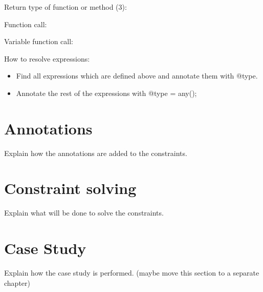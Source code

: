 \documentclass[../main.tex]{subfiles}
\begin{document}
    Return type of function or method (3):    
    \begin{prooftree}
    \end{prooftree}    
    
    \hrulefill
        
    Function call:
    \begin{prooftree}
    \end{prooftree}    
    
    \hrulefill
    
    Variable function call:
    \begin{prooftree}
    \end{prooftree}    
    
    \hrulefill
    
    How to resolve expressions:
    \begin{itemize}
        \item Find all expressions which are defined above and annotate them with @type.
        \item Annotate the rest of the expressions with @type = any();
    \end{itemize}
    
    \section{Annotations}
    Explain how the annotations are added to the constraints.
    
    \section{Constraint solving}
    Explain what will be done to solve the constraints.
    \\
    
    \section{Case Study}
    Explain how the case study is performed. (maybe move this section to a separate chapter)
    \\
\end{document}

